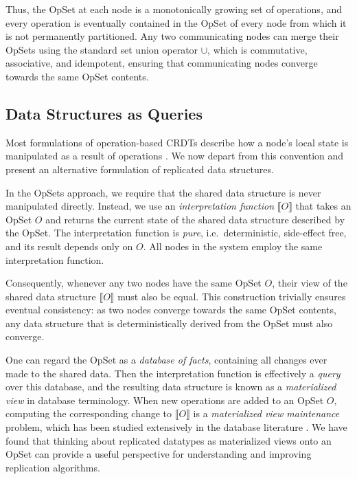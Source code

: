 Thus, the OpSet at each node is a monotonically growing set of operations, and every operation is eventually contained in the OpSet of every node from which it is not permanently partitioned.
Any two communicating nodes can merge their OpSets using the standard set union operator $\cup$, which is commutative, associative, and idempotent, ensuring that communicating nodes converge towards the same OpSet contents.

\subsection{Data Structures as Queries}\label{sec:queries}

Most formulations of operation-based CRDTs describe how a node's local state is manipulated as a result of operations \cite{Shapiro:2011wy,Shapiro:2011un}.
We now depart from this convention and present an alternative formulation of replicated data structures.

In the OpSets approach, we require that the shared data structure is never manipulated directly.
Instead, we use an \emph{interpretation function} $\llbracket O \rrbracket$ that takes an OpSet $O$ and returns the current state of the shared data structure described by the OpSet.
The interpretation function is \emph{pure}, i.e.\ deterministic, side-effect free, and its result depends only on $O$.
All nodes in the system employ the same interpretation function.

Consequently, whenever any two nodes have the same OpSet $O$, their view of the shared data structure $\llbracket O \rrbracket$ must also be equal.
This construction trivially ensures eventual consistency: as two nodes converge towards the same OpSet contents, any data structure that is deterministically derived from the OpSet must also converge.

One can regard the OpSet as a \emph{database of facts}, containing all changes ever made to the shared data.
Then the interpretation function is effectively a \emph{query} over this database, and the resulting data structure is known as a \emph{materialized view} in database terminology.
When new operations are added to an OpSet $O$, computing the corresponding change to $\llbracket O \rrbracket$ is a \emph{materialized view maintenance} problem, which has been studied extensively in the database literature \cite{Gupta:1999uz}.
We have found that thinking about replicated datatypes as materialized views onto an OpSet can provide a useful perspective for understanding and improving replication algorithms.

